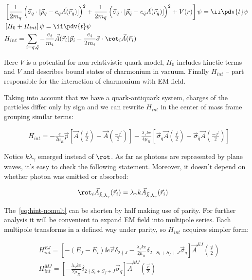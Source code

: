 \begin{align}
    &\left[\frac{1}{2m_q} \left( \vec{\sigma}_q \cdot [\vec{p}_q - e_q \vec{A}(\vec{r}_q)] \right)^2 + \frac{1}{2m_{\bar{q}}} \left( \vec{\sigma}_{\bar{q}} \cdot [\vec{p}_{\bar{q}} - e_{\bar{q}} \vec{A}(\vec{r}_{\bar{q}})] \right)^2 + V(r) \right] \psi = \ii \pdv{t} \psi \\
    &\left[H_0 + H_{int} \right] \psi= \ii \pdv{t} \psi \\
    &H_{int} = \sum_{i = q, \bar{q}} -\frac{e_i}{m_i} \vec{A}(\vec{r}_i) \vec{p}_i - \frac{e_i}{2 m_i} \vec{\sigma} \cdot \rot_i \vec{A}(\vec{r}_i)
\end{align}

Here $V$ is a potential for non-relativistic quark model, $H_0$ includes kinetic terms and $V$ and describes bound states of charmonium in vacuum. Finally $H_{int}$ -- part responsible for the interaction of charmonium with EM field.

Taking into account that we have a quark-antiquark system, charges of the particles differ only by sign and we can rewrite $H_{int}$ in the center of mass frame grouping similar terms:

\begin{align} \label{eq:hint-nomult}
    &H_{int} = -\frac{e}{2 \mu_R} \vec{p} \left[ \vec{A}(\frac{\vec{r}}{2}) + \vec{A}(\frac{-\vec{r}}{2}) \right]-\frac{\lambda_\gamma k e}{4 \mu_R}\left[ \vec{\sigma}_q \vec{A}(\frac{\vec{r}}{2}) - \vec{\sigma}_{\bar{q}} \vec{A}(\frac{-\vec{r}}{2}) \right]
\end{align}

Notice $k \lambda_\gamma$ emerged instead of $\rot$. As far as photons are represented by plane waves, it's easy to check the following statement. Moreover, it doesn't depend on whether photon was emitted or absorbed:

\begin{align}
    &\rot_i \vec{A}_{\vec{k}, \lambda_\gamma}(\vec{r}_i) = \lambda_\gamma k \vec{A}_{\vec{k}, \lambda_\gamma}(\vec{r}_i)
\end{align}

The~\cref{eq:hint-nomult} can be shorten by half making use of parity. For further analysis it will be convenient to expand EM field into multipole series. Each multipole transforms in a defined way under parity, so $H_{int}$ acquires simpler form:

\begin{align} \label{hint-mult-nobrak}
    &H_{int}^{EJ} = \left[ -(E_f - E_i) \ii e \vec{r} \delta_{2 \nmid J} - \frac{\lambda_\gamma k e}{2 \mu_R} \delta_{2 \mid S_i + S_f + J} \vec{\sigma}_q \right] \vec{A}^{EJ}(\frac{\vec{r}}{2}) \\
    &H_{int}^{MJ} = \left[ - \frac{\lambda_\gamma k e}{2 \mu_R} \delta_{2 \nmid S_i + S_f + J} \vec{\sigma}_q \right] \vec{A}^{MJ}(\frac{\vec{r}}{2}) 
\end{align}

